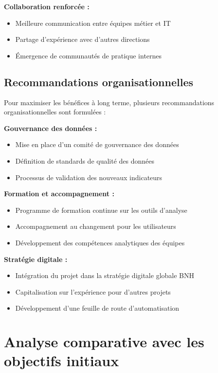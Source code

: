 \textbf{Collaboration renforcée :}
\begin{itemize}
    \item Meilleure communication entre équipes métier et IT
    \item Partage d'expérience avec d'autres directions
    \item Émergence de communautés de pratique internes
\end{itemize}

\subsection{Recommandations organisationnelles}

Pour maximiser les bénéfices à long terme, plusieurs recommandations organisationnelles sont formulées :

\medskip

\textbf{Gouvernance des données :}
\begin{itemize}
    \item Mise en place d'un comité de gouvernance des données
    \item Définition de standards de qualité des données
    \item Processus de validation des nouveaux indicateurs
\end{itemize}

\textbf{Formation et accompagnement :}
\begin{itemize}
    \item Programme de formation continue sur les outils d'analyse
    \item Accompagnement au changement pour les utilisateurs
    \item Développement des compétences analytiques des équipes
\end{itemize}

\textbf{Stratégie digitale :}
\begin{itemize}
    \item Intégration du projet dans la stratégie digitale globale BNH
    \item Capitalisation sur l'expérience pour d'autres projets
    \item Développement d'une feuille de route d'automatisation
\end{itemize}

\section{Analyse comparative avec les objectifs initiaux}

